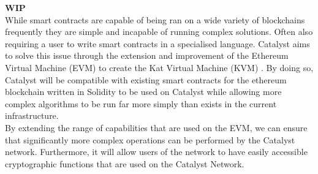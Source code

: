 \textbf{WIP} \\

While smart contracts are capable of being ran on a wide variety of blockchains frequently they are simple and incapable of running complex solutions. Often also requiring a user to write smart contracts in a specialised language. Catalyst aims to solve this issue through the extension and improvement of the Ethereum Virtual Machine (EVM) to create the Kat Virtual Machine (KVM) \cite{KVM}. By doing so, Catalyst will be compatible with existing smart contracts for the ethereum blockchain written in Solidity to be used on Catalyst while allowing more complex algorithms to be run far more simply than exists in the current infrastructure. \\

By extending the range of capabilities that are used on the EVM, we can ensure that significantly more complex operations can be performed by the Catalyst network. Furthermore, it will allow users of the network to have easily accessible cryptographic functions that are used on the Catalyst Network.  
